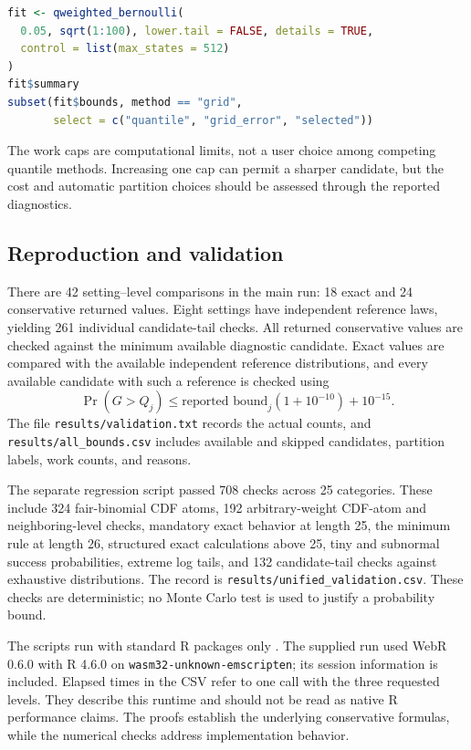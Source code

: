 \documentclass[11pt,letterpaper]{article}
\numberwithin{equation}{section}
\theoremstyle{definition}
\theoremstyle{remark}
\begin{document}
\par\noindent\begin{minipage}{\linewidth}
\begin{lstlisting}[language=R]
fit <- qweighted_bernoulli(
  0.05, sqrt(1:100), lower.tail = FALSE, details = TRUE,
  control = list(max_states = 512)
)
fit$summary
subset(fit$bounds, method == "grid",
       select = c("quantile", "grid_error", "selected"))
\end{lstlisting}
\end{minipage}\par
The work caps are computational limits, not a user choice among competing
quantile methods. Increasing one cap can permit a sharper candidate, but
the cost and automatic partition choices should be assessed through the
reported diagnostics.

\subsection{Reproduction and validation}

There are 42 setting--level comparisons in the main run: 18 exact and
24 conservative returned values. Eight settings have independent reference
laws, yielding 261 individual candidate-tail checks. All returned
conservative values are checked against the minimum available diagnostic
candidate. Exact values are compared with the available independent
reference distributions, and every available candidate with such a
reference is checked using
\[
 \Pr(G>Q_j)\le \text{reported bound}_j(1+10^{-10})+10^{-15}.
\]
The file \texttt{results/validation.txt} records the actual counts, and
\texttt{results/all\_bounds.csv} includes available and skipped candidates,
partition labels, work counts, and reasons.

The separate regression script passed 708 checks across 25 categories.
These include 324 fair-binomial CDF atoms, 192 arbitrary-weight CDF-atom
and neighboring-level checks, mandatory exact behavior at length 25,
the minimum rule at length 26, structured exact calculations above 25,
tiny and subnormal success probabilities, extreme log tails, and 132
candidate-tail checks against exhaustive distributions. The record is
\texttt{results/unified\_validation.csv}. These checks are deterministic;
no Monte Carlo test is used to justify a probability bound.

The scripts run with standard R packages only \citep{rcore2026}. The
supplied run used WebR 0.6.0 with R 4.6.0 on
\texttt{wasm32-unknown-emscripten}; its session information is included.
Elapsed times in the CSV refer to one call with the three requested
levels. They describe this runtime and should not be read as native R
performance claims. The proofs establish the underlying conservative
formulas, while the numerical checks address implementation behavior.
\end{document}
